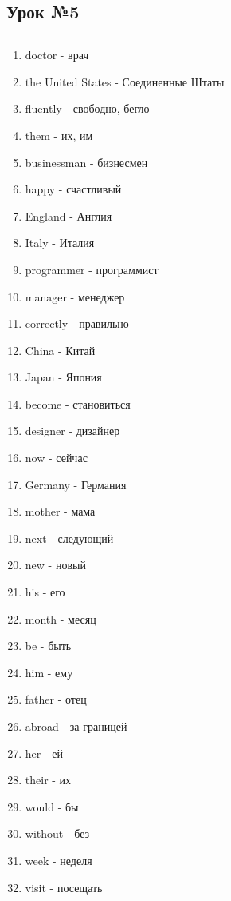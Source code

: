 \subsection{Урок №5}

\subsection*{}
\begin{multicols}{2}
    \begin{enumerate}\setlength{\itemsep}{0pt}
        \item doctor - врач
        \item the United States - Соединенные Штаты
        \item fluently - свободно, бегло
        \item them - их, им
        \item businessman - бизнесмен
        \item happy - счастливый
        \item England - Англия
        \item Italy - Италия
        \item programmer - программист
        \item manager - менеджер
        \item correctly - правильно
        \item China - Китай
        \item Japan - Япония
        \item become - становиться
        \item designer - дизайнер
        \item now - сейчас
        \item Germany - Германия
        \item mother - мама
        \item next - следующий
        \item new - новый
        \item his - его
        \item month - месяц
        \item be - быть
        \item him - ему
        \item father - отец
        \item abroad - за границей
        \item her - ей
        \item their - их
        \item would - бы
        \item without - без
        \item week - неделя
        \item visit - посещать
    \end{enumerate}
\end{multicols}

